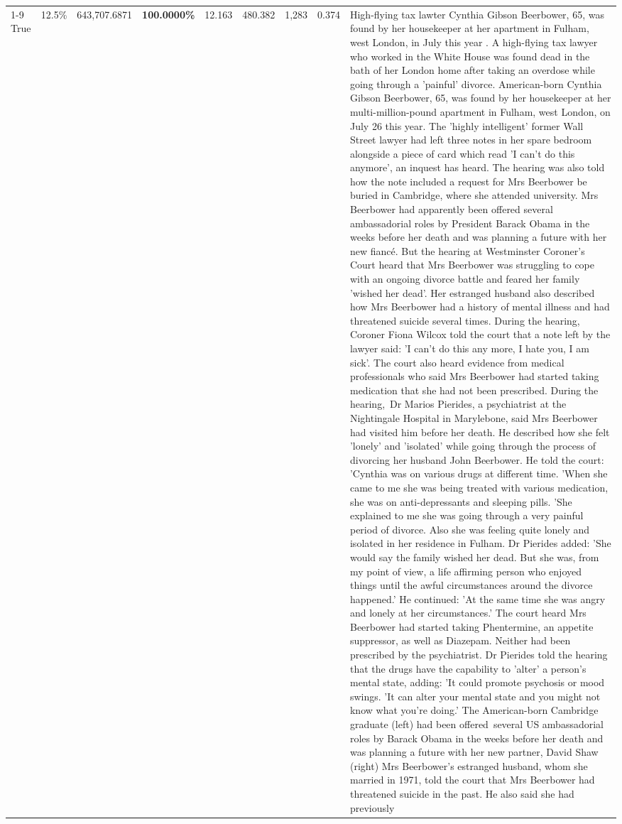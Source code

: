 \begin{table}[H]
\begin{tabular}{lllrlllll}
\cline{1-9}
True & 12.5\% & 643,707.6871 & \bfseries \color{red} 100.0000\% & 12.163 & 480.382 & 1,283 & 0.374 & High-flying tax lawter Cynthia Gibson Beerbower, 65, was found by her housekeeper at her apartment in Fulham, west London, in July this year . A high-flying tax lawyer who worked in the White House was found dead in the bath of her London home after taking an overdose while going through a 'painful' divorce. American-born Cynthia Gibson Beerbower, 65, was found by her housekeeper at her multi-million-pound apartment in Fulham, west London, on July 26 this year. The 'highly intelligent' former Wall Street lawyer had left three notes in her spare bedroom alongside a piece of card which read 'I can't do this anymore', an inquest has heard. The hearing was also told how the note included a request for Mrs Beerbower be buried in Cambridge, where she attended university. Mrs Beerbower had apparently been offered several ambassadorial roles by President Barack Obama in the weeks before her death and was planning a future with her new fiancé. But the hearing at Westminster Coroner's Court heard that Mrs Beerbower was struggling to cope with an ongoing divorce battle and feared her family 'wished her dead'. Her estranged husband also described how Mrs Beerbower had a history of mental illness and had threatened suicide several times. During the hearing, Coroner Fiona Wilcox told the court that a note left by the lawyer said: 'I can't do this any more, I hate you, I am sick'. The court also heard evidence from medical professionals who said Mrs Beerbower had started taking medication that she had not been prescribed. During the hearing, Dr Marios Pierides, a psychiatrist at the Nightingale Hospital in Marylebone, said Mrs Beerbower had visited him before her death. He described how she felt 'lonely' and 'isolated' while going through the process of divorcing her husband John Beerbower. He told the court: 'Cynthia was on various drugs at different time. 'When she came to me she was being treated with various medication, she was on anti-depressants and sleeping pills. 'She explained to me she was going through a very painful period of divorce. Also she was feeling quite lonely and isolated in her residence in Fulham. Dr Pierides added: 'She would say the family wished her dead. But she was, from my point of view, a life affirming person who enjoyed things until the awful circumstances around the divorce happened.' He continued: 'At the same time she was angry and lonely at her circumstances.' The court heard Mrs Beerbower had started taking Phentermine, an appetite suppressor, as well as Diazepam. Neither had been prescribed by the psychiatrist. Dr Pierides told the hearing that the drugs have the capability to 'alter' a person's mental state, adding: 'It could promote psychosis or mood swings. 'It can alter your mental state and you might not know what you're doing.' The American-born Cambridge graduate (left) had been offered several US ambassadorial roles by Barack Obama in the weeks before her death and was planning a future with her new partner, David Shaw (right) Mrs Beerbower's estranged husband, whom she married in 1971, told the court that Mrs Beerbower had threatened suicide in the past. He also said she had previously 
\end{tabular}
\end{table}
